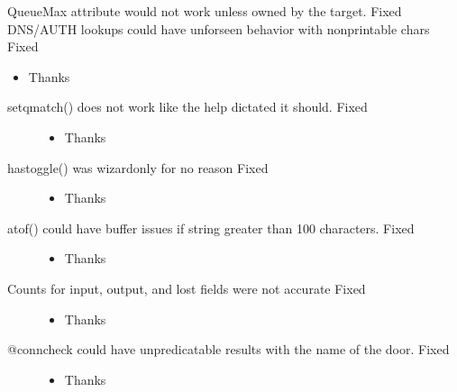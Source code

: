 \documentclass[letterpaper,10pt,english]{sphinxmanual}
\begin{document}
\sphinxAtStartPar
QueueMax attribute would not work unless owned by the target. \sphinxhyphen{} Fixed
DNS/AUTH lookups could have unforseen behavior with non\sphinxhyphen{}printable chars \sphinxhyphen{} Fixed
\begin{itemize}
\item {} 
\sphinxAtStartPar
Thanks 

\end{itemize}
\begin{description}
\item[{setqmatch() does not work like the help dictated it should. \sphinxhyphen{} Fixed}] \leavevmode\begin{itemize}
\item {} 
\sphinxAtStartPar
Thanks 

\end{itemize}

\item[{hastoggle() was wizard\sphinxhyphen{}only for no reason \sphinxhyphen{} Fixed}] \leavevmode\begin{itemize}
\item {} 
\sphinxAtStartPar
Thanks 

\end{itemize}

\item[{atof() could have buffer issues if string greater than 100 characters. \sphinxhyphen{} Fixed}] \leavevmode\begin{itemize}
\item {} 
\sphinxAtStartPar
Thanks 

\end{itemize}

\item[{Counts for input, output, and lost fields were not accurate \sphinxhyphen{} Fixed}] \leavevmode\begin{itemize}
\item {} 
\sphinxAtStartPar
Thanks 

\end{itemize}

\item[{@conncheck could have unpredicatable results with the name of the door. \sphinxhyphen{} Fixed}] \leavevmode\begin{itemize}
\item {} 
\sphinxAtStartPar
Thanks 


\end{itemize}
\end{description}
\end{document}
